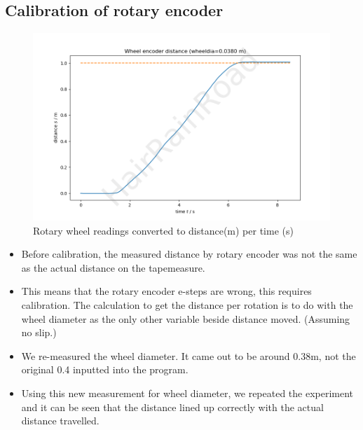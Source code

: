 \documentclass[12pt]{article}
\begin{document}
    \subsection{Calibration of rotary encoder}
    \begin{figure}[H]
        \captionsetup{labelfont=bf}
        \includegraphics[width=40pc]{fig2png.png}
        \caption{Rotary wheel readings converted to distance(m) per time (s)}\label{figure2}
    \end{figure}
    \begin{itemize}
    \item Before calibration, the measured distance by rotary encoder was not the same as the actual distance on the tapemeasure.
    \item This means that the rotary encoder e-steps are wrong, this requires calibration. The calculation to get the distance per rotation
    is to do with the wheel diameter as the only other variable beside distance moved. (Assuming no slip.)
    \item We re-measured the wheel diameter. It came out to be around 0.38m, not the original 0.4 inputted into the program.
    \item Using this new measurement for wheel diameter, we repeated the experiment and it can be seen that the distance lined up correctly
    with the actual distance travelled.
    \end{itemize}
    \newpage
\end{document}
